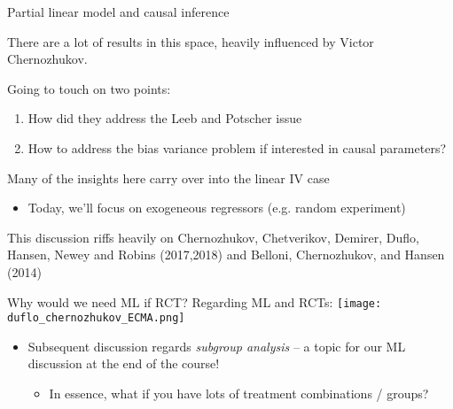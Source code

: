 \documentclass[notes,11pt, aspectratio=169]{beamer}
\newenvironment{wideitemize}{\itemize\addtolength{\itemsep}{10pt}}{\enditemize}
\begin{document}
\begin{frame}{Partial linear model and causal inference}
  \begin{wideitemize}
  \item There are a lot of results in this space, heavily influenced
    by Victor Chernozhukov.
    
  \item  Going to touch on two points:
  \begin{enumerate}
  \item How did they address the Leeb and Potscher issue
  \item How to address the bias variance problem if interested in causal parameters?
  \end{enumerate}
\item Many of the insights here carry over into the linear IV case
  \begin{itemize}
  \item Today, we'll focus on exogeneous regressors (e.g. random
    experiment)
  \end{itemize}
\item This discussion riffs heavily on Chernozhukov, Chetverikov,
  Demirer, Duflo, Hansen, Newey and Robins (2017,2018) and Belloni,
  Chernozhukov, and Hansen (2014)
  \end{wideitemize}
\end{frame}

\begin{frame}{Why would we need ML if RCT?}
  Regarding ML and RCTs:
  \texttt{[image: duflo\_chernozhukov\_ECMA.png]}
  
  \begin{itemize}
  \item   Subsequent discussion regards \emph{subgroup analysis} -- a topic
    for our ML discussion at the end of the course!
    \begin{itemize}
    \item In essence, what if you have lots of treatment combinations /
      groups?
    \end{itemize}
  \end{itemize}
\end{frame}
\end{document}
